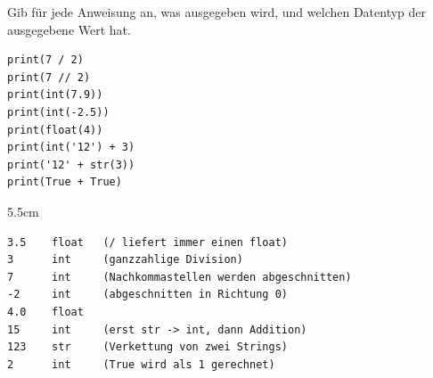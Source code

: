 \question[4]
Gib für jede Anweisung an, was ausgegeben wird, und welchen Datentyp der ausgegebene Wert hat.

\begin{lstlisting}
print(7 / 2)
print(7 // 2)
print(int(7.9))
print(int(-2.5))
print(float(4))
print(int('12') + 3)
print('12' + str(3))
print(True + True)
\end{lstlisting}

\begin{solutionbox}{5.5cm}
\begin{lstlisting}[language={}]
3.5    float   (/ liefert immer einen float)
3      int     (ganzzahlige Division)
7      int     (Nachkommastellen werden abgeschnitten)
-2     int     (abgeschnitten in Richtung 0)
4.0    float
15     int     (erst str -> int, dann Addition)
123    str     (Verkettung von zwei Strings)
2      int     (True wird als 1 gerechnet)
\end{lstlisting}
\end{solutionbox}
